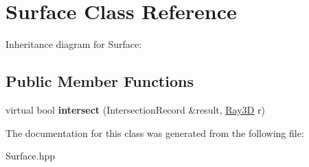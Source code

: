 \hypertarget{classSurface}{}\section{Surface Class Reference}
\label{classSurface}


Inheritance diagram for Surface\+:
\subsection*{Public Member Functions}
\begin{DoxyCompactItemize}
\item 
\mbox{\label{classSurface_a18dd7d10e0cba6856abdc29ee7ab5b0b}} 
virtual bool {\bfseries intersect} (Intersection\+Record \&result, \hyperlink{classRay3D}{Ray3D} r)
\end{DoxyCompactItemize}


The documentation for this class was generated from the following file\+:\begin{DoxyCompactItemize}
\item 
Surface.\+hpp\end{DoxyCompactItemize}

